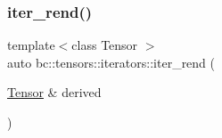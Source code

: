\mbox{\label{namespacebc_1_1tensors_1_1iterators_aecd2f684f561e9b78f7e71f0dbb09e01}} 
\subsubsection{\texorpdfstring{iter\+\_\+rend()}{iter\_rend()}}
{\footnotesize\ttfamily template$<$class Tensor $>$ \\
auto bc\+::tensors\+::iterators\+::iter\+\_\+rend (\begin{DoxyParamCaption}\item[{\hyperlink{namespacebc_a659391e47ab612be3ba6c18cf9c89159}{Tensor} \&}]{derived }\end{DoxyParamCaption})}

